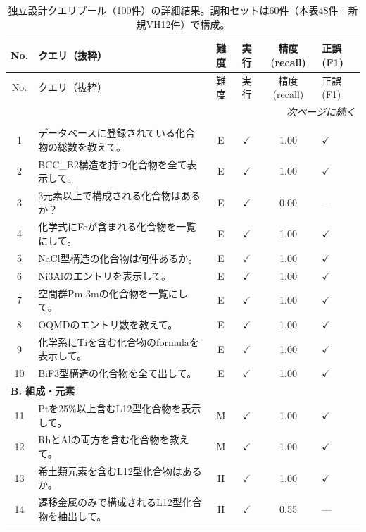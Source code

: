 \documentclass[5p,twocolumn]{elsarticle}
\begin{document}
\begin{longtable}{clcccl}
  \caption{独立設計クエリプール（100件）の詳細結果。調和セットは60件（本表48件＋新規VH12件）で構成。}
  \label{tab:sup_expert_detail} \\
  \toprule
  No. & クエリ（抜粋） & 難度 & 実行 & 精度(recall) & 正誤(F1) \\
  \midrule
  \endfirsthead
  \toprule
  No. & クエリ（抜粋） & 難度 & 実行 & 精度(recall) & 正誤(F1) \\
  \midrule
  \endhead
  \midrule
  \multicolumn{6}{r}{\textit{次ページに続く}} \\
  \endfoot
  \bottomrule
  \endlastfoot
    \multicolumn{6}{l}{\textbf{A. 基本検索}} \\
    \midrule
    1 & データベースに登録されている化合物の総数を教えて。 & E & $\checkmark$ & 1.00 & $\checkmark$ \\
    2 & BCC\_B2構造を持つ化合物を全て表示して。 & E & $\checkmark$ & 1.00 & $\checkmark$ \\
    3 & 3元素以上で構成される化合物はあるか？ & E & $\checkmark$ & 0.00 & --- \\
    4 & 化学式にFeが含まれる化合物を一覧にして。 & E & $\checkmark$ & 1.00 & $\checkmark$ \\
    5 & NaCl型構造の化合物は何件あるか。 & E & $\checkmark$ & 1.00 & $\checkmark$\\
    6 & Ni3Alのエントリを表示して。 & E & $\checkmark$ & 1.00 & $\checkmark$ \\
    7 & 空間群Pm-3mの化合物を一覧にして。 & E & $\checkmark$ & 1.00 & $\checkmark$\\
    8 & OQMDのエントリ数を教えて。 & E & $\checkmark$ & 1.00 & $\checkmark$\\
    9 & 化学系にTiを含む化合物のformulaを表示して。 & E & $\checkmark$ & 1.00 & $\checkmark$ \\
    10 & BiF3型構造の化合物を全て出して。 & E & $\checkmark$ & 1.00 & $\checkmark$ \\
    \midrule
    \multicolumn{6}{l}{\textbf{B. 組成・元素}} \\
    \midrule
    11 & Ptを25\%以上含むL12型化合物を表示して。 & M & $\checkmark$ & 1.00 & $\checkmark$ \\
    12 & RhとAlの両方を含む化合物を教えて。 & M & $\checkmark$ & 1.00 & $\checkmark$ \\
    13 & 希土類元素を含むL12型化合物はあるか。 & H & $\checkmark$ & 1.00 & $\checkmark$ \\
    14 & 遷移金属のみで構成されるL12型化合物を抽出して。 & H & $\checkmark$ & 0.55 & ---\\

\end{longtable}
\end{document}
